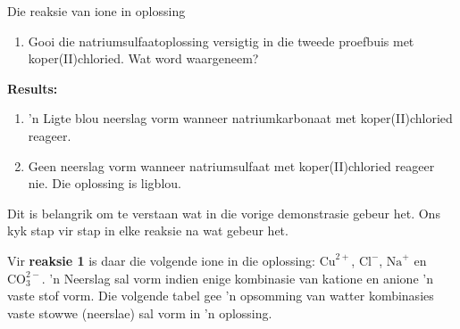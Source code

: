 \begin{g_experiment}{Die reaksie van ione in oplossing}
\begin{enumerate}[noitemsep, label=\textbf{\arabic*}. ]
\label{m38719*uid64}\item Gooi die natriumsulfaatoplossing versigtig in die tweede proefbuis met koper(II)chloried. Wat word waargeneem?
\end{enumerate}
        \par 
      \label{m38719*id340060}\noindent{}\textbf{Results:}
        \newline
      \label{m38719*id340067}\begin{enumerate}[noitemsep, label=\textbf{\arabic*}. ] 
            \label{m38719*uid65}\item  'n Ligte blou neerslag vorm wanneer natriumkarbonaat met koper(II)chloried reageer.
\label{m38719*uid66}\item Geen neerslag vorm wanneer natriumsulfaat met koper(II)chloried reageer nie. Die oplossing is ligblou.
\end{enumerate}
        \par 
\end{g_experiment}
      \label{m38719*id340106}Dit is belangrik om te verstaan wat in die vorige demonstrasie gebeur het.  Ons kyk stap vir stap in elke reaksie na wat gebeur het.\par 
Vir \textbf{reaksie 1} is daar die volgende ione in die oplossing: ${\text{Cu}}^{2+}$, ${\text{Cl}}^{-}$, ${\text{Na}}^{+}$ en $\text{CO}_{3}^{2-}$.   'n Neerslag sal vorm indien enige kombinasie van katione en anione  'n vaste stof vorm. Die volgende tabel gee  'n opsomming van watter kombinasies vaste stowwe (neerslae) sal vorm in 'n oplossing. 
